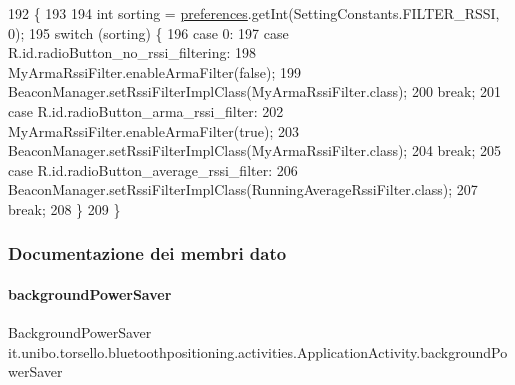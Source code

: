 \begin{DoxyCode}
192                                  \{
193 
194         \textcolor{keywordtype}{int} sorting = \hyperlink{classit_1_1unibo_1_1torsello_1_1bluetoothpositioning_1_1activities_1_1ApplicationActivity_a3ee672ef79c268d0618ff3276c2e85f0_a3ee672ef79c268d0618ff3276c2e85f0}{preferences}.getInt(SettingConstants.FILTER\_RSSI, 0);
195         \textcolor{keywordflow}{switch} (sorting) \{
196             \textcolor{keywordflow}{case} 0:
197             \textcolor{keywordflow}{case} R.id.radioButton\_no\_rssi\_filtering:
198                 MyArmaRssiFilter.enableArmaFilter(\textcolor{keyword}{false});
199                 BeaconManager.setRssiFilterImplClass(MyArmaRssiFilter.class);
200                 \textcolor{keywordflow}{break};
201             \textcolor{keywordflow}{case} R.id.radioButton\_arma\_rssi\_filter:
202                 MyArmaRssiFilter.enableArmaFilter(\textcolor{keyword}{true});
203                 BeaconManager.setRssiFilterImplClass(MyArmaRssiFilter.class);
204                 \textcolor{keywordflow}{break};
205             \textcolor{keywordflow}{case} R.id.radioButton\_average\_rssi\_filter:
206                 BeaconManager.setRssiFilterImplClass(RunningAverageRssiFilter.class);
207                 \textcolor{keywordflow}{break};
208         \}
209     \}
\end{DoxyCode}


\subsubsection{Documentazione dei membri dato}
\hypertarget{classit_1_1unibo_1_1torsello_1_1bluetoothpositioning_1_1activities_1_1ApplicationActivity_a85885639575161f4d73d4fc788f44ace_a85885639575161f4d73d4fc788f44ace}{}\label{classit_1_1unibo_1_1torsello_1_1bluetoothpositioning_1_1activities_1_1ApplicationActivity_a85885639575161f4d73d4fc788f44ace_a85885639575161f4d73d4fc788f44ace} 
\paragraph{\texorpdfstring{background\+Power\+Saver}{backgroundPowerSaver}}
{\footnotesize\ttfamily Background\+Power\+Saver it.\+unibo.\+torsello.\+bluetoothpositioning.\+activities.\+Application\+Activity.\+background\+Power\+Saver\hspace{0.3cm}{\ttfamily [private]}}

